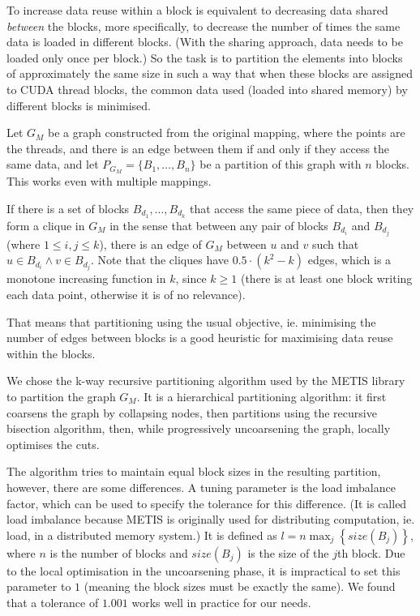 To increase data reuse within a block is equivalent to decreasing data shared
\emph{between} the blocks, more specifically, to decrease the number of times
the same data is loaded in different blocks. (With the sharing approach, data
needs to be loaded only once per block.) So the task is to partition the
elements into blocks of approximately the same size in such a way that when
these blocks are assigned to CUDA thread blocks, the common data used (loaded
into shared memory) by different blocks is minimised.

Let $G_M$ be a graph constructed from the original mapping, where the points are
the threads, and there is an edge between them if and only if they access the
same data, and let $P_{G_M} = \{B_1, \ldots, B_n\}$ be a partition of this graph
with $n$ blocks. This works even with multiple mappings.

If there is a set of blocks $B_{d_1}, \ldots, B_{d_k}$ that access the same
piece of data, then they form a clique in $G_M$ in the sense that between any
pair of blocks $B_{d_i}$ and $B_{d_j}$ (where $1 \le i,j \le k$), there is an
edge of $G_M$ between $u$ and $v$ such that $u \in B_{d_i} \wedge v \in
B_{d_j}$. Note that the cliques have $0.5 \cdot (k^2 - k)$ edges, which is a
monotone increasing function in $k$, since $k \ge 1$ (there is at least one
block writing each data point, otherwise it is of no relevance).

That means that partitioning using the usual objective, ie. minimising the
number of edges between blocks is a good heuristic for maximising data reuse
within the blocks.

We chose the k-way recursive partitioning algorithm used by the
METIS\cite{metis} library to partition the graph $G_M$. It is a hierarchical
partitioning algorithm: it first coarsens the graph by collapsing nodes, then
partitions using the recursive bisection algorithm, then, while progressively
uncoarsening the graph, locally optimises the cuts.

The algorithm tries to maintain equal block sizes in the resulting partition,
however, there are some differences. A tuning parameter is the load imbalance
factor, which can be used to specify the tolerance for this difference. (It is
called load imbalance because METIS is originally used for distributing
computation, ie. load, in a distributed memory system.) It is defined as $l =
n\max_j \left\{ size(B_j) \right\}$, where $n$ is the number of blocks and
$size(B_j)$ is the size of the $j$th block. Due to the local optimisation in the
uncoarsening phase, it is impractical to set this parameter to $1$ (meaning the
block sizes must be exactly the same). We found that a tolerance of $1.001$
works well in practice for our needs.

